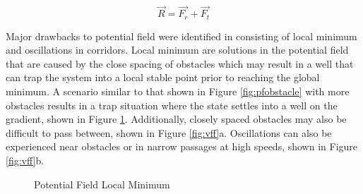 \documentclass[numbered,pdftex]{ohio-etd}
\begin{document}
\begin{equation}\label{eq:vffHeading}
\overrightarrow{R} = \overrightarrow{F_r} + \overrightarrow{F_t}
\end{equation}

Major drawbacks to potential field were identified in \cite{koren_potential_1991} consisting of local minimum and oscillations in corridors. Local minimum are solutions in the potential field that are caused by the close spacing of obstacles which may result in a well that can trap the system into a local stable point prior to reaching the global minimum. A scenario similar to that shown in Figure \ref{fig:pfobstacle} with more obstacles results in a trap situation where the state settles into a well on the gradient, shown in Figure \ref{fig:pfLocalMin}. Additionally, closely spaced obstacles may also be difficult to pass between, shown in Figure \ref{fig:vff}a. Oscillations can also be experienced near obstacles or in narrow passages at high speeds, shown in Figure \ref{fig:vff}b.



 

\begin{figure}[H]
	\begin{subfigmatrix}{2}%
		\centering
	\end{subfigmatrix}
	\caption{Potential Field Local Minimum \cite{liu_virtual-waypoint_2016}}
	\label{fig:pfLocalMin}
\end{figure}
\end{document}
